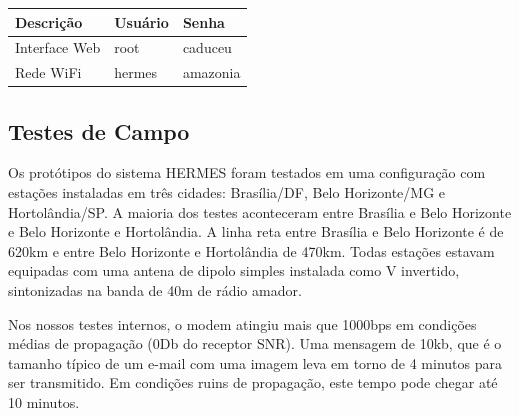 \documentclass[11pt,a4paper]{article}
\begin{document}

\begin{table}[h]

\centering
\begin{tabular}{|l|l|l|}
\hline
Descrição & Usuário & Senha  \\ \hline
Interface Web & root  & caduceu \\  \hline
Rede WiFi & hermes & amazonia \\ \hline
\end{tabular}
\end{table}

\subsection{Testes de Campo}
\label{apx_field_trials}

Os protótipos do sistema HERMES foram testados em uma configuração com estações instaladas em três cidades: Brasília/DF, Belo Horizonte/MG e Hortolândia/SP. A maioria dos testes aconteceram entre Brasília e Belo Horizonte e Belo Horizonte e Hortolândia. A linha reta entre Brasília e Belo Horizonte é de 620km e entre Belo Horizonte e Hortolândia de 470km. Todas estações estavam equipadas com uma antena de dipolo simples instalada como V invertido, sintonizadas na banda de 40m de rádio amador.


Nos nossos testes internos, o modem atingiu mais que 1000bps em condições médias de propagação (0Db do receptor SNR). Uma mensagem de 10kb, que é o tamanho típico de um e-mail com uma imagem leva em torno de 4 minutos para ser transmitido. Em condições ruins de propagação, este tempo pode chegar até 10 minutos.
\end{document}
